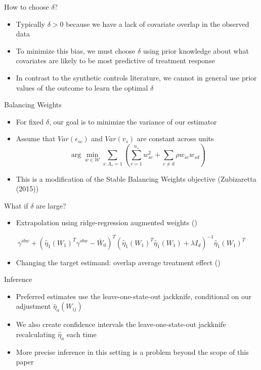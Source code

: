 \documentclass[hyperref={pdfpagelabels=false}]{beamer}
\begin{document}
\begin{frame}{How to choose $\delta$?}
    \begin{itemize}
        \item Typically $\delta > 0$ because we have a lack of covariate overlap in the observed data \bigskip
        \item To minimize this bias, we must choose $\delta$ using prior knowledge about what covariates are likely to be most predictive of treatment response \bigskip
        \item In contrast to the synthetic controls literature, we cannot in general use prior values of the outcome to learn the optimal $\delta$ \bigskip
    \end{itemize}
\end{frame}

\begin{frame}{Balancing Weights}
    \begin{itemize}
        \item For fixed $\delta$, our goal is to minimize the variance of our estimator \bigskip
        \item Assume that $Var(\epsilon_{sc})$ and $Var(v_s)$ are constant across units \bigskip
        $$
        \arg\min_{w \in \mathcal{W}}\sum_{s: A_s = 1}(\sum_{c = 1}^{n_s}w_{sc}^2 + \sum_{c \ne d}\rho w_{sc}w_{sd})
        $$
        \item This is a modification of the Stable Balancing Weights objective (Zubizaretta (2015))
    \end{itemize}
\end{frame}

\begin{frame}{What if $\delta$ are large?}
    \begin{itemize}
        \item Extrapolation using ridge-regression augmented weights (\cite{ben2018augmented}) \bigskip
    \end{itemize}
    
    $$
    \gamma^{sbw} + (\hat{\eta}_1(W_1)^T\gamma^{sbw} - \bar{W}_0)^T(\hat{\eta}_1(W_1)^T\hat{\eta}_1(W_1) + \lambda I_d)^{-1}\hat{\eta}_1(W_1)^T
    $$
    \bigskip
    \begin{itemize}
        \item Changing the target estimand: overlap average treatment effect (\cite{li2018balancing})
    \end{itemize}
\end{frame}

\begin{frame}{Inference}
    \begin{itemize}
        \item Preferred estimates use the leave-one-state-out jackknife, conditional on our adjustment $\hat{\eta}_a(W_{ij})$ \bigskip
        \item We also create confidence intervals the leave-one-state-out jackknife recalculating $\hat{\eta}_a$ each time \bigskip
        \item More precise inference in this setting is a problem beyond the scope of this paper
    \end{itemize}
\end{frame}
\end{document}
